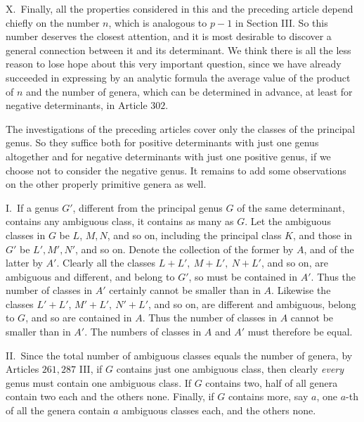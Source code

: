 X.\ Finally, all the properties considered in this and the preceding article depend chiefly on the number \(n\), which is analogous to \(p-1\) in Section III. So this number deserves the closest attention, and it is most desirable to discover a general connection between it and its determinant. We think there is all the less reason to lose hope about this very important question, since we have already succeeded in expressing by an analytic formula the average value of the product of \(n\) and the number of genera, which can be determined in advance, at least for negative determinants, in Article \(302\).

The investigations of the preceding articles cover only the classes of the principal genus. So they suffice both for positive determinants with just one genus altogether and for negative determinants with just one positive genus, if we choose not to consider the negative genus. It remains to add some observations on the other properly primitive genera as well.

I.\ If a genus \(G'\), different from the principal genus \(G\) of the same determinant, contains any ambiguous class, it contains as many as \(G\). Let the ambiguous classes in \(G\) be \(L\), \(M,N\), and so on, including the principal class \(K\), and those in \(G'\) be \(L',M',N'\), and so on. Denote the collection of the former by \(A\), and of the latter by \(A'\). Clearly all the classes \(L+L',\ M+L',\ N+L'\), and so on, are ambiguous and different, and belong to \(G'\), so must be contained in \(A'\). Thus the number of classes in \(A'\) certainly cannot be smaller than in \(A\). Likewise the classes \(L'+L'\), \(M'+L',\ N'+L'\), and so on, are different and ambiguous, belong to \(G\), and so are contained in \(A\). Thus the number of classes in \(A\) cannot be smaller than in \(A'\). The numbers of classes in \(A\) and \(A'\) must therefore be equal.

II.\ Since the total number of ambiguous classes equals the number of genera, by Articles \(261,287\) III, if \(G\) contains just one ambiguous
class, then clearly \textit{every} genus must contain one ambiguous class. If \(G\) contains two, half of all genera contain two each and the others none. Finally, if \(G\) contains more, say \(a\), one \(a\)-th of all the genera contain \(a\) ambiguous classes each, and the others none.

